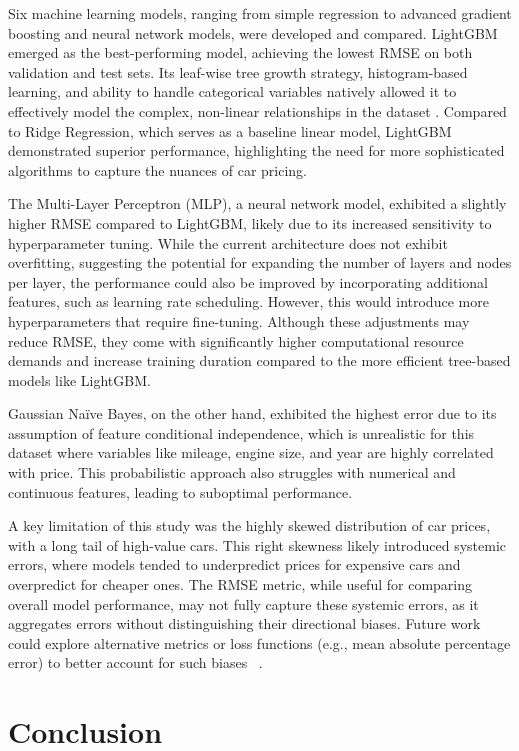 \documentclass{article}
\begin{document}
Six machine learning models, ranging from simple regression to advanced gradient boosting and neural network models, were developed and compared. LightGBM emerged as the best-performing model, achieving the lowest RMSE on both validation and test sets. Its leaf-wise tree growth strategy, histogram-based learning, and ability to handle categorical variables natively allowed it to effectively model the complex, non-linear relationships in the dataset . Compared to Ridge Regression, which serves as a baseline linear model, LightGBM demonstrated superior performance, highlighting the need for more sophisticated algorithms to capture the nuances of car pricing.

The Multi-Layer Perceptron (MLP), a neural network model, exhibited a slightly higher RMSE compared to LightGBM, likely due to its increased sensitivity to hyperparameter tuning. While the current architecture does not exhibit overfitting, suggesting the potential for expanding the number of layers and nodes per layer, the performance could also be improved by incorporating additional features, such as learning rate scheduling. However, this would introduce more hyperparameters that require fine-tuning. Although these adjustments may reduce RMSE, they come with significantly higher computational resource demands and increase training duration compared to the more efficient tree-based models like LightGBM.

Gaussian Na\"{i}ve Bayes, on the other hand, exhibited the highest error due to its assumption of feature conditional independence, which is unrealistic for this dataset where variables like mileage, engine size, and year are highly correlated with price. This probabilistic approach also struggles with numerical and continuous features, leading to suboptimal performance.

A key limitation of this study was the highly skewed distribution of car prices, with a long tail of high-value cars. This right skewness likely introduced systemic errors, where models tended to underpredict prices for expensive cars and overpredict for cheaper ones. The RMSE metric, while useful for comparing overall model performance, may not fully capture these systemic errors, as it aggregates errors without distinguishing their directional biases. Future work could explore alternative metrics or loss functions (e.g., mean absolute percentage error) to better account for such biases ~\cite{Tofallis_2015}.

\section{Conclusion}
\end{document}
